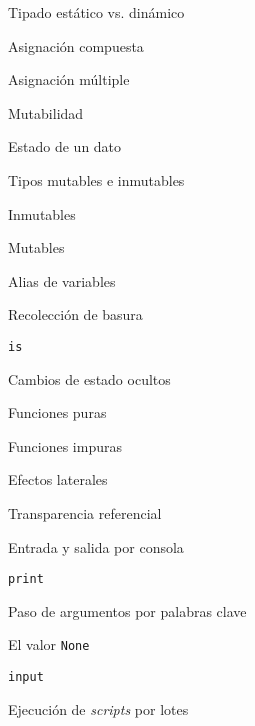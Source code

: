 \begin{longenum}
\begin{longenum}
\begin{longenum}
            \item Tipado estático vs. dinámico
            \item Asignación compuesta
            \item Asignación múltiple
        \end{longenum}
        \item Mutabilidad
        \begin{longenum}
            \item Estado de un dato
            \item Tipos mutables e inmutables
            \begin{longenum}
                \item Inmutables
                \item Mutables
            \end{longenum}
            \item Alias de variables
            \begin{longenum}
                \item Recolección de basura
                \item \texttt{is}
            \end{longenum}
        \end{longenum}
        \item Cambios de estado ocultos
        \begin{longenum}
            \item Funciones puras
            \item Funciones impuras
            \item Efectos laterales
            \item Transparencia referencial
            \item Entrada y salida por consola
            \begin{longenum}
                \item \texttt{print}
                \begin{longenum}
                    \item Paso de argumentos por palabras clave
                    \item El valor \texttt{None}
                \end{longenum}
                \item \texttt{input}
            \end{longenum}
            \item Ejecución de \textit{scripts} por lotes
            \begin{longenum}

\end{longenum}
\end{longenum}
\end{longenum}
\end{longenum}
